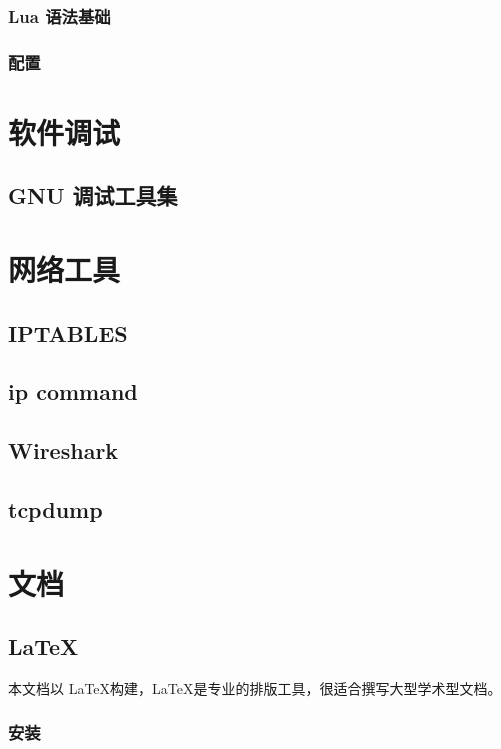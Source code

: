 \subsubsection{Lua 语法基础}

\subsubsection{配置}

\section{软件调试}
\subsection{GNU 调试工具集}

\section{网络工具}

\subsection{IPTABLES}

\subsection{ip command}

\subsection{Wireshark}

\subsection{tcpdump}

\section{文档}

\subsection{\LaTeX}

本文档以 \LaTeX 构建，\LaTeX 是专业的排版工具，很适合撰写大型学术型文档。

\subsubsection*{安装}

